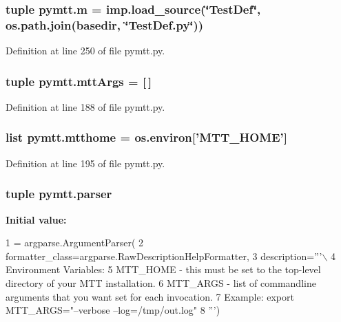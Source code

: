 \hypertarget{namespacepymtt_ab13a60c31fa69917ce06c1a2631aaf02}{
\subsubsection[{m}]{\setlength{\rightskip}{0pt plus 5cm}tuple pymtt.\-m = imp.\-load\-\_\-source(\char`\"{}Test\-Def\char`\"{}, os.\-path.\-join({\bf basedir}, \char`\"{}Test\-Def.\-py\char`\"{}))}}\label{namespacepymtt_ab13a60c31fa69917ce06c1a2631aaf02}


Definition at line 250 of file pymtt.\-py.

\hypertarget{namespacepymtt_a7dea31bd26744bab0b1c30dc11c718aa}{
\subsubsection[{mtt\-Args}]{\setlength{\rightskip}{0pt plus 5cm}tuple pymtt.\-mtt\-Args = \mbox{[}$\,$\mbox{]}}}\label{namespacepymtt_a7dea31bd26744bab0b1c30dc11c718aa}


Definition at line 188 of file pymtt.\-py.

\hypertarget{namespacepymtt_a109ef76f074b08666398bf6a38219cfc}{
\subsubsection[{mtthome}]{\setlength{\rightskip}{0pt plus 5cm}list pymtt.\-mtthome = os.\-environ\mbox{[}'M\-T\-T\-\_\-\-H\-O\-M\-E'\mbox{]}}}\label{namespacepymtt_a109ef76f074b08666398bf6a38219cfc}


Definition at line 195 of file pymtt.\-py.

\hypertarget{namespacepymtt_a95d54fdad48aac280be9d57cf81dee68}{
\subsubsection[{parser}]{\setlength{\rightskip}{0pt plus 5cm}tuple pymtt.\-parser}}\label{namespacepymtt_a95d54fdad48aac280be9d57cf81dee68}
{\bfseries Initial value\-:}
\begin{DoxyCode}
1 = argparse.ArgumentParser(
2     formatter\_class=argparse.RawDescriptionHelpFormatter,
3     description=\textcolor{stringliteral}{'''\(\backslash\)}
4 \textcolor{stringliteral}{Environment Variables:}
5 \textcolor{stringliteral}{  MTT\_HOME - this must be set to the top-level directory of your MTT installation.}
6 \textcolor{stringliteral}{  MTT\_ARGS - list of commandline arguments that you want set for each invocation.}
7 \textcolor{stringliteral}{    Example: export MTT\_ARGS="--verbose --log=/tmp/out.log"}
8 \textcolor{stringliteral}{'''})
\end{DoxyCode}


